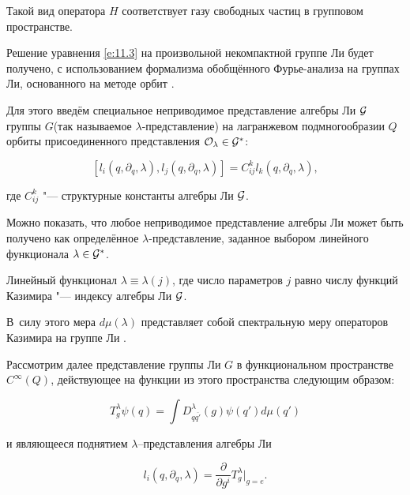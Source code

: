 Такой вид оператора $H$ соответствует газу свободных частиц в групповом пространстве.



Решение уравнения \eqref{e:11.3} на произвольной некомпактной группе Ли будет получено, с использованием формализма обобщённого Фурье-анализа на группах Ли, основанного на методе орбит \cite{mikh:bib:Kir, mikh:bib:SS}.



Для этого введём специальное неприводимое представление алгебры Ли $\cal G$ группы $G$(так называемое $\lambda$-представление) на лагранжевом подмногообразии $Q$ орбиты присоединенного представления $\cal

O_{\lambda}\in\cal G^{*}$:

\begin{equation}\label{lr}

[l_i(q,\partial_{q},\lambda),l_j(q,\partial_{q},\lambda)]=C^{k}_{ij}l_k(q,\partial_{q},\lambda),

\end{equation}

где $C^{k}_{ij}$ "--- структурные константы алгебры Ли $\cal G$.

Можно показать, что любое неприводимое представление алгебры Ли может быть получено как определённое $\lambda$-представление, заданное выбором линейного функционала $\lambda \in \cal G^{*}$. 

Линейный функционал $\lambda \equiv \lambda(j)$, где число параметров $j$ равно числу функций Казимира "--- индексу алгебры Ли $\cal G$. 

В~силу этого мера $d\mu(\lambda)$ представляет собой спектральную меру операторов Казимира на группе Ли \cite{mikh:bib:Shir1}.



Рассмотрим далее представление группы Ли $G$ в функциональном пространстве $C^{\infty}(Q)$, действующее на функции из этого пространства следующим образом:

\begin{equation}\label{T}

T^{\lambda}_{g}\psi(q)=\int D^{\lambda}_{q \overline{q'}}(g)\psi(q')d\mu(q')

\end{equation}

и являющееся поднятием $\lambda$--представления алгебры Ли

\begin{equation}\label{eq:zeta}

l_{i}(q,{\partial}_{q},\lambda)=\frac{\partial}{\partial g^{i}}T^{\lambda}_{g}|_{g=e}.

\end{equation}

